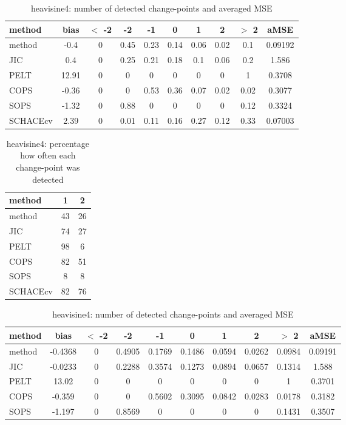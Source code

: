 \begin{table}[ht]
\centering
\begin{tabular}{l|c|ccccccc|c}
  \hline
method & bias & $<$ -2 & -2 & -1 & 0 & 1 & 2 & $>$ 2 & aMSE \\ 
  \hline
method &  -0.4 &     0 &  0.45 &  0.23 &  0.14 &  0.06 &  0.02 &   0.1 & 0.09192 \\ 
  JIC &   0.4 &     0 &  0.25 &  0.21 &  0.18 &   0.1 &  0.06 &   0.2 & 1.586 \\ 
  PELT & 12.91 &     0 &     0 &     0 &     0 &     0 &     0 &     1 & 0.3708 \\ 
  COPS & -0.36 &     0 &     0 &  0.53 &  0.36 &  0.07 &  0.02 &  0.02 & 0.3077 \\ 
  SOPS & -1.32 &     0 &  0.88 &     0 &     0 &     0 &     0 &  0.12 & 0.3324 \\ 
  SCHACEcv &  2.39 &     0 &  0.01 &  0.11 &  0.16 &  0.27 &  0.12 &  0.33 & 0.07003 \\ 
   \hline
\end{tabular}
\caption{heavisine4: number of detected change-points and averaged MSE} 
\label{tab:heavisine4Njumps}
\end{table}
\begin{table}[ht]
\centering
\begin{tabular}{l|cc}
  \hline
method & 1 & 2 \\ 
  \hline
method &     43 &     26 \\ 
  JIC &     74 &     27 \\ 
  PELT &     98 &      6 \\ 
  COPS &     82 &     51 \\ 
  SOPS &      8 &      8 \\ 
  SCHACEcv &     82 &     76 \\ 
   \hline
\end{tabular}
\caption{heavisine4: percentage how often each change-point was detected} 
\label{tab:heavisine4Detections}
\end{table}
\begin{table}[ht]
\centering
\begin{tabular}{l|c|ccccccc|c}
  \hline
method & bias & $<$ -2 & -2 & -1 & 0 & 1 & 2 & $>$ 2 & aMSE \\ 
  \hline
method & -0.4368 &     0 & 0.4905 & 0.1769 & 0.1486 & 0.0594 & 0.0262 & 0.0984 & 0.09191 \\ 
  JIC & -0.0233 &     0 & 0.2288 & 0.3574 & 0.1273 & 0.0894 & 0.0657 & 0.1314 & 1.588 \\ 
  PELT & 13.02 &     0 &     0 &     0 &     0 &     0 &     0 &     1 & 0.3701 \\ 
  COPS & -0.359 &     0 &     0 & 0.5602 & 0.3095 & 0.0842 & 0.0283 & 0.0178 & 0.3182 \\ 
  SOPS & -1.197 &     0 & 0.8569 &     0 &     0 &     0 &     0 & 0.1431 & 0.3507 \\ 
   \hline
\end{tabular}
\caption{heavisine4: number of detected change-points and averaged MSE} 
\label{tab:heavisine4Njumps}
\end{table}
